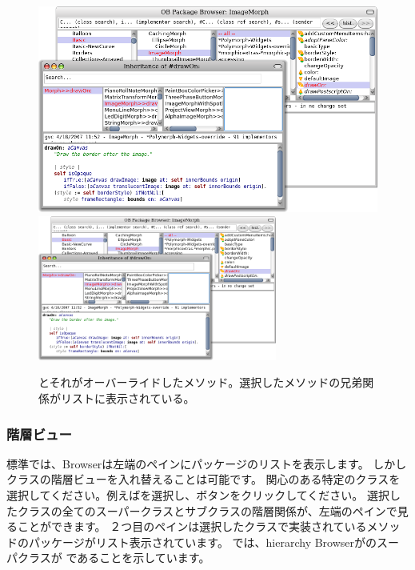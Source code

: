 \documentclass[a4paper,10pt,twoside]{book}
\begin{document}
\begin{figure}[btp]
	\begin{center}
   \ifluluelse
		{\includegraphics[width=\textwidth]{OBInheritanceOverriding}}
		{\includegraphics[width=0.7\textwidth]{OBInheritanceOverriding}}
	\end{center}
	\caption{ とそれがオーバーライドしたメソッド。選択したメソッドの兄弟関係がリストに表示されている。}
\end{figure}

\subsubsection{階層ビュー}

標準では、Browserは左端のペインにパッケージのリストを表示します。
しかしクラスの階層ビューを入れ替えることは可能です。
関心のある特定のクラスを選択してください。例えばを選択し、ボタンをクリックしてください。
選択したクラスの全てのスーパークラスとサブクラスの階層関係が、左端のペインで見ることができます。
２つ目のペインは選択したクラスで実装されているメソッドのパッケージがリスト表示されています。
では、hierarchy Browserがのスーパクラスが であることを示しています。
\end{document}
